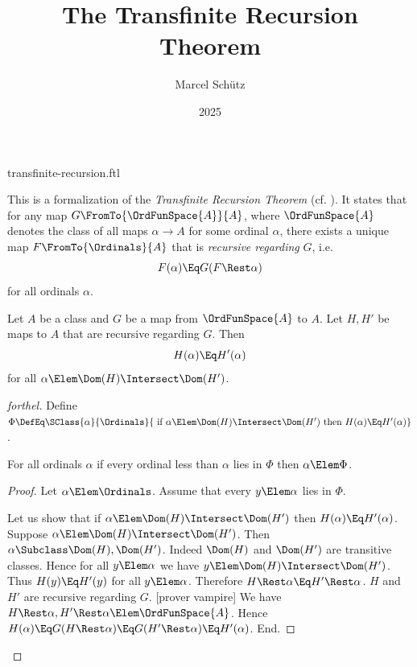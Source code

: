 \documentclass{stex}
\title{The Transfinite Recursion Theorem}
\author{Marcel Schütz}
\date{2025}
\begin{document}
\begin{smodule}{transfinite-recursion.ftl}



\maketitle

\noindent This is a formalization of the \emph{Transfinite Recursion Theorem}
(cf. \cite{Koepke2018}).
It states that for any map $G \FromTo{\OrdFunSpace{A}}{A}$, where
$\OrdFunSpace{A}$ denotes the class of all maps $\alpha \to A$ for some
ordinal $\alpha$, there exists a unique map $F \FromTo{\Ordinals}{A}$ that is
\emph{recursive regarding} $G$, i.e. \[F(\alpha) \Eq G(F \Rest \alpha)\] for
all ordinals $\alpha$.

\begin{lemma}[forthel,title=Coincidence Lemma,name=coincidence lemma]
  Let $A$ be a class and $G$ be a map from $\OrdFunSpace{A}$ to $A$.
  Let $H, H'$ be maps to $A$ that are recursive regarding $G$.
  Then \[ H(\alpha) \Eq H'(\alpha) \] for all $\alpha \Elem \Dom(H) \Intersect \Dom(H')$.
\end{lemma}
\begin{proof}[forthel]
  Define $\Phi \DefEq \SClass{\alpha}{\Ordinals}{\text{ if }
  \alpha \Elem \Dom(H) \Intersect \Dom(H')\text{ then }H(\alpha) \Eq H'(\alpha)}$.

  For all ordinals $\alpha$ if every ordinal less than $\alpha$ lies in $\Phi$ then $\alpha \Elem \Phi$.
  \begin{proof}
    Let $\alpha \Elem \Ordinals$.
    Assume that every $y \Elem \alpha$ lies in $\Phi$.

    Let us show that if $\alpha \Elem \Dom(H) \Intersect \Dom(H')$ then
    $H(\alpha) \Eq H'(\alpha)$.
      Suppose $\alpha \Elem \Dom(H) \Intersect \Dom(H')$.
      Then $\alpha \Subclass \Dom(H), \Dom(H')$.
      Indeed $\Dom(H)$ and $\Dom(H')$ are transitive classes.
      Hence for all $y \Elem \alpha$ we have $y \Elem\linebreak \Dom(H) \Intersect \Dom(H')$.
      Thus $H(y) \Eq H'(y)$ for all $y \Elem \alpha$.
      Therefore $H \Rest \alpha \Eq\linebreak H' \Rest \alpha$.
      $H$ and $H'$ are recursive regarding $G$.
      [prover vampire]
      We have $H \Rest \alpha, H' \Rest \alpha \Elem \OrdFunSpace{A}$.
      Hence $H(\alpha)
        \Eq G(H \Rest \alpha)
        \Eq G(H' \Rest \alpha)
        \Eq H'(\alpha)$.
    End.


\end{proof}
\end{proof}
\end{smodule}
\end{document}
